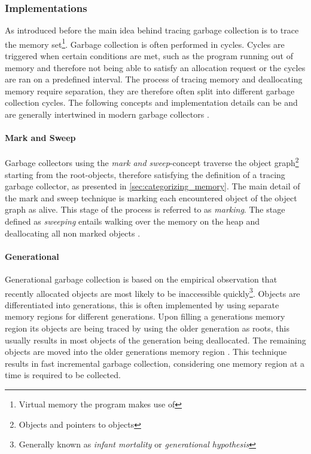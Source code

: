 \subsubsection{Implementations}

As introduced before the main idea behind tracing garbage collection is to
trace the memory set\footnote{Virtual memory the program makes use of}. Garbage
collection is often performed in cycles. Cycles are triggered when certain
conditions are met, such as the program running out of memory and therefore not
being able to satisfy an allocation request or the cycles are ran on a
predefined interval. The process of tracing memory and deallocating memory
require separation, they are therefore often split into different garbage
collection cycles. The following concepts and implementation details can be and
are generally intertwined in modern garbage collectors \cite[The GC
cycle]{go_gcguide_2022} \cite{ocmal_gc_unknown}.

\paragraph{Mark and Sweep}

Garbage collectors using the \textit{mark and sweep}-concept traverse the
object graph\footnote{Objects and pointers to objects} starting from the
root-objects, therefore satisfying the definition of a tracing garbage
collector, as presented in \autoref{sec:categorizing_memory}. The main detail
of the mark and sweep technique is marking each encountered object of the
object graph as alive. This stage of the process is referred to as
\textit{marking}. The stage defined as \textit{sweeping} entails walking over
the memory on the heap and deallocating all non marked objects \cite[Tracing
Garbage Collection]{go_gcguide_2022}.

\paragraph{Generational}

Generational garbage collection is based on the empirical observation that
recently allocated objects are most likely to be inaccessible
quickly\footnote{Generally known as \textit{infant mortality} or
\textit{generational hypothesis}}. Objects are differentiated into generations,
this is often implemented by using separate memory regions for different
generations. Upon filling a generations memory region its objects are being
traced by using the older generation as roots, this usually results in most
objects of the generation being deallocated. The remaining objects are moved
into the older generations memory region \cite[2 Age-based Garbage
Collection]{age-based-gc_1999}. This technique results in fast incremental
garbage collection, considering one memory region at a time is required to be
collected. \cite[3 Benchmarks]{age-based-gc_1999}

